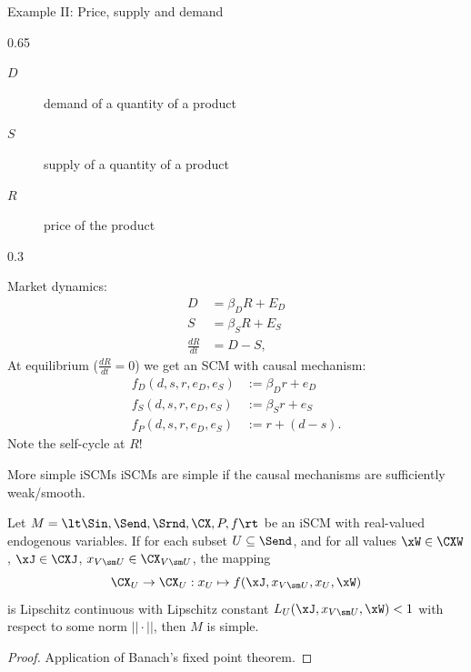 \begin{frame}{Example II: Price, supply and demand}
  \begin{topalignedcolumn}{0.65\linewidth}
  \begin{description}
     \item[$D$] demand of a quantity of a product
     \item[$S$] supply of a quantity of a product
     \item[$R$] price of the product
  \end{description}
  \end{topalignedcolumn}\hfill%
  \begin{topalignedcolumn}{0.3\linewidth}
  \end{topalignedcolumn}

  \medskip
  Market dynamics:
$$\begin{aligned}
    D &= \beta_D R + E_D \\
    S &= \beta_S R + E_S \\
    \frac{dR}{dt} &= D - S,
  \end{aligned}$$
  At equilibrium ($\frac{dR}{dt}=0$) we get an SCM with causal mechanism:
$$
  \begin{aligned}
    f_D(d,s,r,e_D,e_S) &:= \beta_D r + e_D \\
    f_S(d,s,r,e_D,e_S) &:= \beta_S r + e_S \\
    f_P(d,s,r,e_D,e_S) &:= r + (d - s).
  \end{aligned}
$$
  Note the self-cycle at $R$!
\end{frame}

\begin{frame}{More simple iSCMs}
  iSCMs are simple if the causal mechanisms are sufficiently weak/smooth.
  \begin{Prp}[\ref{prp:simple_scm_contraction}]
  Let $M = \lt \Sin, \Send, \Srnd, \CX, P, f \rt$ be an iSCM with real-valued endogenous variables.
  If for each subset $U \subseteq \Send$, and for all values $\xW\in\CXW$, $\xJ \in \CXJ$, $x_{V\sm U} \in \CX_{V\sm U}$, the mapping
  \begin{equation*}
  \CX_U \to \CX_U : x_U \mapsto f(\xJ,x_{V\sm U},x_U,\xW)
  \end{equation*}
  is Lipschitz continuous with Lipschitz constant $L_U(\xJ,x_{V\sm U},\xW) < 1$ with respect to some norm $||\cdot||$, then $M$ is simple.
\end{Prp}
\begin{proof}
  Application of Banach's fixed point theorem.
\end{proof}
\end{frame}

